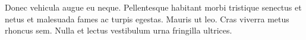 {\sffamily
Donec vehicula augue eu neque. Pellentesque habitant morbi tristique senectus
et netus et malesuada fames ac turpis egestas. Mauris ut leo. Cras viverra
metus rhoncus sem. Nulla et lectus vestibulum urna fringilla ultrices.}
